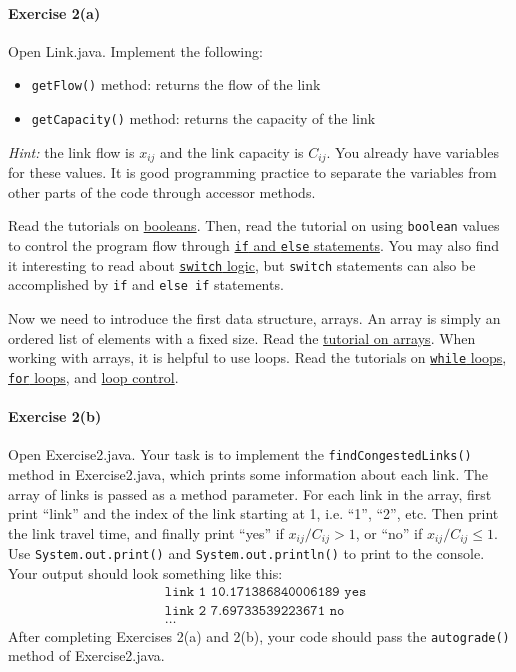 \documentclass[11pt]{article}
\begin{document}
\paragraph*{Exercise 2(a)} Open Link.java. 
Implement the following:
\begin{itemize}
	\item \texttt{getFlow()} method: returns the flow of the link
	
	\item \texttt{getCapacity()} method: returns the capacity of the link
\end{itemize}\textit{Hint:} the link flow is $x_{ij}$ and the link capacity is $C_{ij}$. You already have variables for these values. It is good programming practice to separate the variables from other parts of the code through accessor methods. 

\vspace{\baselineskip}

\noindent
Read the tutorials on \href{https://www.w3schools.com/java/java_booleans.asp}{booleans}. Then, read the tutorial on using \texttt{boolean} values to control the program flow through \href{https://www.w3schools.com/java/java_conditions.asp}{\texttt{if} and \texttt{else} statements}. You may also find it interesting to read about \href{https://www.w3schools.com/java/java_switch.asp}{\texttt{switch} logic}, but \texttt{switch} statements can also be accomplished by \texttt{if} and \texttt{else if} statements.

Now we need to introduce the first data structure, arrays. An array is simply an ordered list of elements with a fixed size. Read the \href{https://www.w3schools.com/java/java_arrays.asp}{tutorial on arrays}. When working with arrays, it is helpful to use loops. Read the tutorials on \href{https://www.w3schools.com/java/java_while_loop.asp}{\texttt{while} loops}, \href{https://docs.oracle.com/javase/tutorial/java/nutsandbolts/while.html}{\texttt{for} loops}, and \href{https://www.w3schools.com/java/java_break.asp}{loop control}.

\paragraph*{Exercise 2(b)} Open Exercise2.java. Your task is to implement the \texttt{findCongestedLinks()} method in Exercise2.java, which prints some information about each link.  The array of links is passed as a method parameter. For each link in the array, first print ``link'' and the index of the link starting at 1, i.e. ``1'', ``2'', etc. Then print the link travel time, and finally print ``yes'' if $x_{ij}/C_{ij} >1$, or ``no'' if $x_{ij}/C_{ij} \leq 1$. Use \texttt{System.out.print()} and \texttt{System.out.println()} to print to the console.
	Your output should look something like this:
	\begin{align*}
		& \texttt{link 1 10.171386840006189 yes} \\
		&\texttt{link 2 7.69733539223671 no} \\
		& \ldots
	\end{align*}
After completing Exercises 2(a) and 2(b), your code should pass the \texttt{autograde()} method of Exercise2.java. 
	
\end{document}
